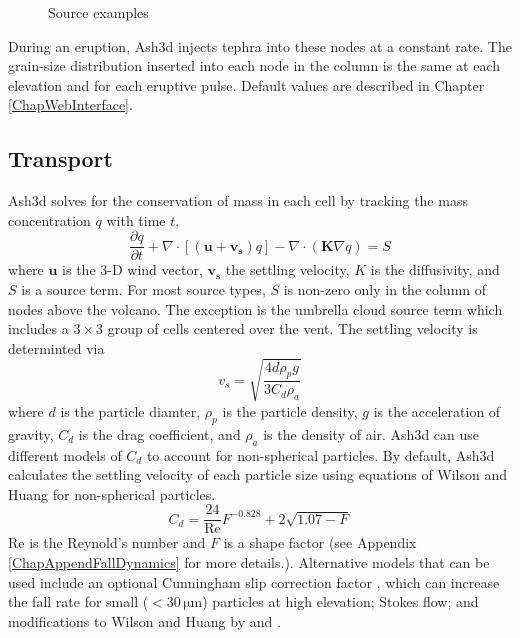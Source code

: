 \begin{figure}[htbp]
\parbox{15cm}{\caption{\label{FigSourceExample}
Source examples}}
\end{figure}

During an eruption, Ash3d injects tephra into these nodes at a constant
rate. The grain-size distribution inserted into each node in the column
is the same at each elevation and for each eruptive pulse.
Default values are described in Chapter \ref{ChapWebInterface}.

\subsection{Transport}\label{ChapIntroSecTrans}
Ash3d solves for the conservation of mass in each cell by tracking the mass
concentration $q$ with time $t$,
\begin{equation}\label{EqGovEqVect}
 \frac{\partial q}{\partial t} +
   \nabla \cdot \left[ \left(\mathbf{u} + \mathbf{v_s} \right) q \right]
 - \nabla \cdot \left( \mathbf{K} \nabla q\right) = S
\end{equation}
where $\mathbf{u}$ is the 3-D wind vector,
$\mathbf{v_s}$ the settling velocity, $K$ is the
diffusivity, and $S$ is a source term.  For most source types, $S$
is non-zero only in the column of nodes above the volcano.  The
exception is the umbrella cloud source term which includes a
$3 \times 3$ group of cells centered over the vent.
The settling velocity is determinted via \cite[p.182]{Bird60}
\begin{equation}
v_s=\sqrt{\frac{4d\rho_p g}{3C_d\rho_a}}\label{EqFallVel}
\end{equation}
where $d$ is the particle diamter, $\rho_p$ is the particle density, $g$ is
the acceleration of gravity, $C_d$ is the drag coefficient, and $\rho_a$
is the density of air.
Ash3d can use different models of $C_d$ to account for non-spherical particles.
By default, Ash3d calculates the settling
velocity of each particle size using equations of Wilson and Huang \cite{Wilson79}
for non-spherical particles.
\begin{equation}
C_d = \frac{24}{\mathrm{Re}}F^{-0.828}+2 \sqrt{1.07-F}\label{EqDragWH}
\end{equation}
$\mathrm{Re}$ is the Reynold's number and $F$ is a shape factor (see
Appendix \ref{ChapAppendFallDynamics} for more details.).
Alternative models that can be used include an
optional Cunningham slip correction factor \cite[p.407]{Seinfeld06},
which can increase the fall rate for small ($<30 \,\mathrm{\mu m}$)
particles at high elevation;
Stokes flow; and modifications to Wilson and Huang by \cite{Ganser93} and
\cite{Pfeiffer05}.

